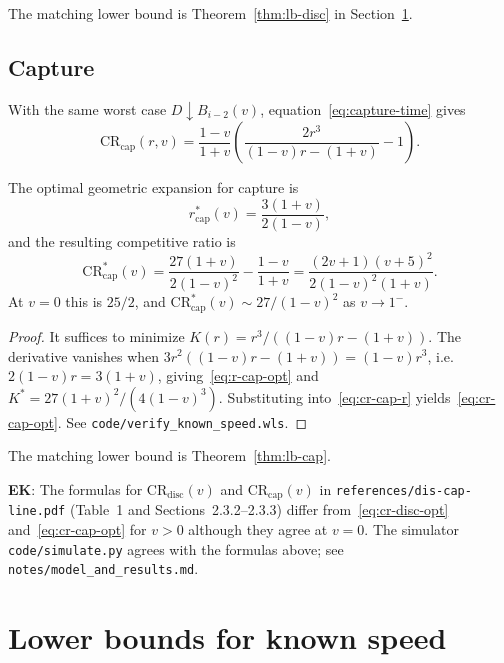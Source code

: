 \documentclass[runningheads,envcountsame,envcountsect]{llncs}
\newcommand\EK[1]{{\color{Blue} \textbf{EK}: #1}}
\newcommand{\CR}{\mathrm{CR}}
\newcommand{\disc}{\mathrm{disc}}
\newcommand{\capt}{\mathrm{cap}}
\begin{document}
The matching lower bound is Theorem~\ref{thm:lb-disc} in Section~\ref{sec:lower}.

\subsection{Capture}

With the same worst case $D \downarrow B_{i-2}(v)$, equation~\eqref{eq:capture-time} gives
\begin{equation}\label{eq:cr-cap-r}
  \CR_{\capt}(r, v) = \frac{1 - v}{1 + v} \left( \frac{2 r^3}{(1 - v) r - (1 + v)} - 1 \right) .
\end{equation}

\begin{theorem}\label{thm:cap-known}
The optimal geometric expansion for capture is
\begin{equation}\label{eq:r-cap-opt}
  r^{*}_{\capt}(v) = \frac{3 (1 + v)}{2 (1 - v)},
\end{equation}
and the resulting competitive ratio is
\begin{equation}\label{eq:cr-cap-opt}
  \CR^{*}_{\capt}(v) = \frac{27 (1 + v)}{2 (1 - v)^2} - \frac{1 - v}{1 + v} = \frac{(2v + 1)(v + 5)^2}{2 (1 - v)^2 (1 + v)} .
\end{equation}
At $v = 0$ this is $25/2$, and $\CR^{*}_{\capt}(v) \sim 27/(1-v)^2$ as $v \to 1^-$.
\end{theorem}
\begin{proof}
It suffices to minimize $K(r) = r^3 / ((1-v) r - (1+v))$. The derivative vanishes when $3 r^2 ((1-v) r - (1+v)) = (1-v) r^3$, i.e.\ $2(1-v) r = 3(1+v)$, giving~\eqref{eq:r-cap-opt} and $K^{*} = 27(1+v)^2 / (4(1-v)^3)$. Substituting into~\eqref{eq:cr-cap-r} yields~\eqref{eq:cr-cap-opt}. See \texttt{code/verify\_known\_speed.wls}.
\end{proof}

The matching lower bound is Theorem~\ref{thm:lb-cap}.

\EK{The formulas for $\CR_{\disc}(v)$ and $\CR_{\capt}(v)$ in \texttt{references/dis-cap-line.pdf} (Table~1 and Sections~2.3.2--2.3.3) differ from~\eqref{eq:cr-disc-opt} and~\eqref{eq:cr-cap-opt} for $v > 0$ although they agree at $v = 0$. The simulator \texttt{code/simulate.py} agrees with the formulas above; see \texttt{notes/model\_and\_results.md}.}

\FloatBarrier
\section{Lower bounds for known speed}\label{sec:lower}
\end{document}
